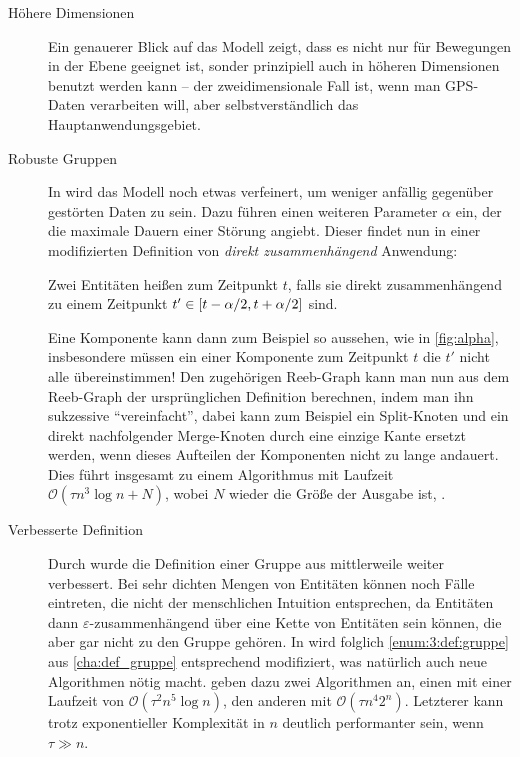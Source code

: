 \begin{description}
    \item[Höhere Dimensionen] Ein genauerer Blick auf das Modell zeigt, dass es nicht nur für Bewegungen in der Ebene geeignet ist, sonder prinzipiell auch in höheren Dimensionen benutzt werden kann -- der zweidimensionale Fall ist, wenn man GPS-Daten verarbeiten will, aber selbstverständlich das Hauptanwendungsgebiet.
    \item[Robuste Gruppen] In \textcite[Sec.~4]{buchin2015} wird das Modell noch etwas verfeinert, um weniger anfällig gegenüber gestörten Daten zu sein.
    Dazu führen \textcite{buchin2015} einen weiteren Parameter $\alpha$ ein, der die maximale Dauern einer Störung angiebt.
    Dieser findet nun in einer modifizierten Definition von \emph{direkt zusammenhängend} Anwendung:
    
    \begin{definition}
        Zwei Entitäten heißen  zum Zeitpunkt $t$, falls sie direkt zusammenhängend zu einem Zeitpunkt $t' \in \benbrace*{t- \alpha/2, t+ \alpha/2}$ sind.
    \end{definition}
    
    Eine Komponente kann dann zum Beispiel so aussehen, wie in \cref{fig:alpha}, insbesondere müssen ein einer Komponente zum Zeitpunkt $t$ die $t'$ nicht alle übereinstimmen!
    Den zugehörigen Reeb-Graph kann man nun aus dem Reeb-Graph der ursprünglichen Definition berechnen, indem man ihn sukzessive \enquote{vereinfacht}, dabei kann zum Beispiel ein Split-Knoten und ein direkt nachfolgender Merge-Knoten durch eine einzige Kante ersetzt werden, wenn dieses Aufteilen der Komponenten nicht zu lange andauert.
    Dies führt insgesamt zu einem Algorithmus mit Laufzeit $\mathcal{O}(\tau n^3 \log n + N)$, wobei $N$ wieder die Größe der Ausgabe ist, \cite[Thm.~13]{buchin2015}.
    \item[Verbesserte Definition] Durch \textcite{grouping_improved} wurde die Definition einer Gruppe aus \textcite{buchin2015} mittlerweile weiter verbessert.
    Bei sehr dichten Mengen von Entitäten können noch Fälle eintreten, die nicht der menschlichen Intuition entsprechen, da Entitäten dann $\varepsilon$-zusammenhängend über eine Kette von Entitäten sein können, die aber gar nicht zu den Gruppe gehören.
    In \textcite{grouping_improved} wird folglich \cref{enum:3:def:gruppe} aus \cref{cha:def_gruppe} entsprechend modifiziert, was natürlich auch neue Algorithmen nötig macht.
    \textcite{grouping_improved} geben dazu zwei Algorithmen an, einen mit einer Laufzeit von $\mathcal{O}(\tau^2 n^5 \log n)$, den anderen mit $\mathcal{O}(\tau n^4 2^n)$.
    Letzterer kann trotz exponentieller Komplexität in $n$ deutlich performanter sein, wenn $\tau \gg n$.
\end{description}

